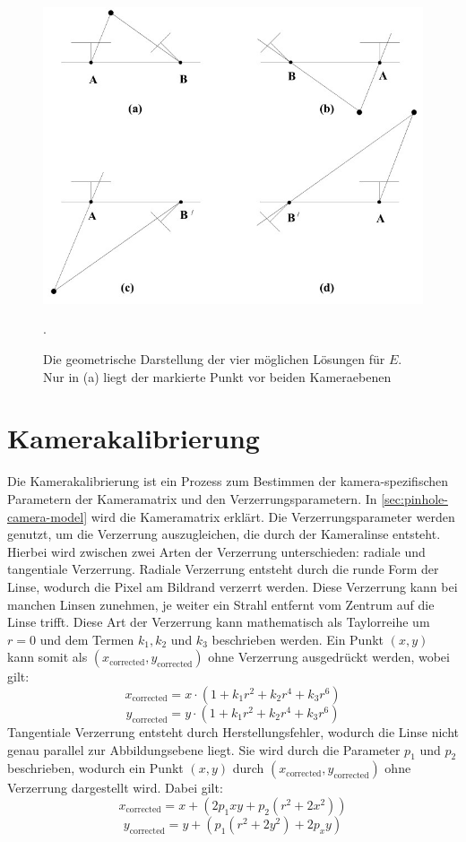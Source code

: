 \begin{figure}[h!]
    \includegraphics[width=\textwidth]{src/img/hartley_2003_e_geometry.jpg}
    \caption{Die geometrische Darstellung der vier möglichen Lösungen für $E$. Nur in (a) liegt der markierte Punkt vor beiden Kameraebenen~\cite[Fig. 9.12]{hartley_2003}}.
    \label{fig:theory-essential-matrix-geometry}
\end{figure}

\section{Kamerakalibrierung}\label{sec:theory-calibration}
Die Kamerakalibrierung ist ein Prozess zum Bestimmen der kamera-spezifischen Parametern der Kameramatrix und den Verzerrungsparametern. 
In \cref{sec:pinhole-camera-model} wird die Kameramatrix erklärt.
Die Verzerrungsparameter werden genutzt, um die Verzerrung auszugleichen, die durch der Kameralinse entsteht.
Hierbei wird zwischen zwei Arten der Verzerrung unterschieden: radiale und tangentiale Verzerrung.
Radiale Verzerrung entsteht durch die runde Form der Linse, wodurch die Pixel am Bildrand verzerrt werden.
Diese Verzerrung kann bei manchen Linsen zunehmen, je weiter ein Strahl entfernt vom Zentrum auf die Linse trifft. 
Diese Art der Verzerrung kann mathematisch als Taylorreihe um $r = 0$ und dem Termen $k_1, k_2$ und $k_3$ beschrieben werden.
Ein Punkt $(x, y)$ kann somit als $(x_{\text{corrected}},y_{\text{corrected}})$ ohne Verzerrung ausgedrückt werden, wobei gilt:
\[x_\text{corrected} = x \cdot (1 + k_1r^2 + k_2r^4 + k_3r^6)\]
\[y_\text{corrected} = y \cdot (1 + k_1r^2 + k_2r^4 + k_3r^6)\]
Tangentiale Verzerrung entsteht durch Herstellungsfehler, wodurch die Linse nicht genau parallel zur Abbildungsebene liegt.  
Sie wird durch die Parameter $p_1$ und $p_2$ beschrieben, wodurch ein Punkt $(x,y)$ durch $(x_{\text{corrected}},y_{\text{corrected}})$ ohne Verzerrung dargestellt wird. 
Dabei gilt:
\[x_\text{corrected} = x + (2p_1xy + p_2(r^2 + 2x^2))\]
\[y_\text{corrected} = y + (p_1(r^2 + 2y^2) + 2p_xy)\]
\cite{kaehler_2016}

